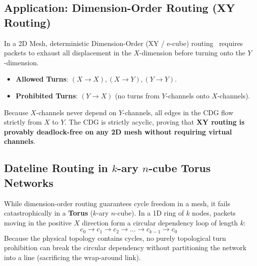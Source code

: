 \subsection{Application: Dimension-Order Routing (XY Routing)}
In a 2D Mesh, deterministic Dimension-Order (XY / e-cube) routing~\cite{Sullivan1977,Dally1987} requires packets to exhaust all displacement in the $X$-dimension before turning onto the $Y$-dimension.
\begin{itemize}
    \item \textbf{Allowed Turns}: $(X \to X), (X \to Y), (Y \to Y)$.
    \item \textbf{Prohibited Turns}: $(Y \to X)$ (no turns from $Y$-channels onto $X$-channels).
\end{itemize}
Because $X$-channels never depend on $Y$-channels, all edges in the CDG flow strictly from $X$ to $Y$. The CDG is strictly acyclic, proving that \textbf{XY routing is provably deadlock-free on any 2D mesh without requiring virtual channels}.

\subsection{Dateline Routing in $k$-ary $n$-cube Torus Networks}
\label{subsec:ch5_dateline}

While dimension-order routing guarantees cycle freedom in a mesh, it fails catastrophically in a \textbf{Torus} ($k$-ary $n$-cube). In a 1D ring of $k$ nodes, packets moving in the positive $X$ direction form a circular dependency loop of length $k$:
\begin{equation}
c_0 \longrightarrow c_1 \longrightarrow c_2 \longrightarrow \dots \longrightarrow c_{k-1} \longrightarrow c_0
\label{eq:ch5_ring_cycle}
\end{equation}
Because the physical topology contains cycles, no purely topological turn prohibition can break the circular dependency without partitioning the network into a line (sacrificing the wrap-around link).

